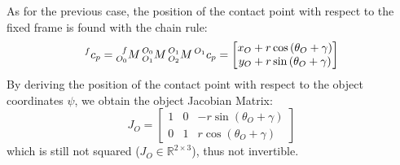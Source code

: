 \documentclass[a4paper,12pt,oneside]{report}
\begin{document}
As for the previous case, the position of the contact point with respect to the fixed frame is found with the chain rule:
\begin{equation}
  \prescript{f}{}{c_p}=\prescript{f}{O_0}{M}\prescript{O_0}{O_1}{M}\prescript{O_1}{O_2}{M}\prescript{O_1}{}{c_p}=\begin{bmatrix}
    x_O + r \cos{(\theta_O+\gamma)}\\
    y_O + r \sin{(\theta_O+\gamma)}
  \end{bmatrix}
\end{equation}
By deriving the position of the contact point with respect to the object coordinates $\psi$, we obtain the object Jacobian Matrix:
\begin{equation}
  J_O=\begin{bmatrix}
    1&0&-r\sin{(\theta_O+\gamma)}\\
    0&1&r\cos{(\theta_O+\gamma)}
  \end{bmatrix}
  \label{object_jacobian}
\end{equation}
which is still not squared ($J_O \in \mathbb{R}^{2 \times 3}$), thus not invertible.\\
\end{document}
